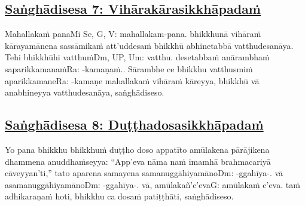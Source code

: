 \subsection*{\hyperref[comm7]{Saṅghādisesa 7: Vihārakārasikkhāpadaṁ}}
\label{sd7}

Mahallakaṁ pana\makeatletter\hyperlink{endnote-appendix}\makeatother Mi Se, G, V: mahallakam-pana. bhikkhunā vihāraṁ kārayamānena sassāmikaṁ att'uddesaṁ bhikkhū abhinetabbā vatthudesanāya. Tehi bhikkhūhi vatthuṁ\makeatletter\hyperlink{endnote-appendix}\makeatother Dm, UP, Um: vatthu. desetabbaṁ anārambhaṁ saparikkamanaṁ\makeatletter\hyperlink{endnote-appendix}\makeatother Ra: -kamaṇaṁ.. Sārambhe ce bhikkhu vatthusmiṁ aparikkamane\makeatletter\hyperlink{endnote-appendix}\makeatother Ra: -kamaṇe mahallakaṁ vihāraṁ kāreyya, bhikkhū vā anabhineyya vatthudesanāya, saṅghādiseso.



\subsection*{\hyperref[comm8]{Saṅghādisesa 8: Duṭṭhadosasikkhāpadaṁ}}
\label{sd8}

Yo pana bhikkhu bhikkhuṁ duṭṭho doso appatīto amūlakena pārājikena dhammena anuddhaṁseyya: ``App'eva nāma naṁ imamhā brahmacariyā cāveyyan'ti,'' tato aparena samayena samanuggāhiyamāno\makeatletter\hyperlink{endnote-appendix}\makeatother Dm: -ggahīya-.  vā asamanuggāhiyamāno\makeatletter\hyperlink{endnote-appendix}\makeatother Dm: -ggahīya-.  vā, amūlakañ'c'eva\makeatletter\hyperlink{endnote-appendix}\makeatother G: amūlakaṁ c'eva. taṁ adhikaraṇaṁ hoti, bhikkhu ca dosaṁ patiṭṭhāti, saṅghādiseso.



